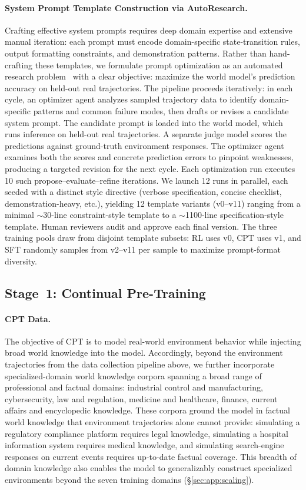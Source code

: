 \documentclass{llmxive}
\begin{document}
\paragraph{System Prompt Template Construction via AutoResearch.}
Crafting effective system prompts requires deep domain expertise and extensive manual iteration: each prompt must encode domain-specific state-transition rules, output formatting constraints, and demonstration patterns.
Rather than hand-crafting these templates, we formulate prompt optimization as an automated research problem~\citep{karpathy2026autoresearch} with a clear objective: maximize the world model's prediction accuracy on held-out real trajectories.
The pipeline proceeds iteratively: in each cycle, an optimizer agent analyzes sampled trajectory data to identify domain-specific patterns and common failure modes, then drafts or revises a candidate system prompt.
The candidate prompt is loaded into the world model, which runs inference on held-out real trajectories. A separate judge model scores the predictions against ground-truth environment responses.
The optimizer agent examines both the scores and concrete prediction errors to pinpoint weaknesses, producing a targeted revision for the next cycle.
Each optimization run executes 10 such propose--evaluate--refine iterations.
We launch 12 runs in parallel, each seeded with a distinct style directive (verbose specification, concise checklist, demonstration-heavy, etc.), yielding 12 template variants (v0--v11) ranging from a minimal $\sim$30-line constraint-style template to a $\sim$1100-line specification-style template.
Human reviewers audit and approve each final version.
The three training pools draw from disjoint template subsets: RL uses v0, CPT uses v1, and SFT randomly samples from v2--v11 per sample to maximize prompt-format diversity.


\subsection{Stage~1: Continual Pre-Training}
\label{sec:pipeline:cpt}

\paragraph{CPT Data.}
The objective of CPT is to model real-world environment behavior while injecting broad world knowledge into the model.
Accordingly, beyond the environment trajectories from the data collection pipeline above, we further incorporate specialized-domain world knowledge corpora spanning a broad range of professional and factual domains: industrial control and manufacturing, cybersecurity, law and regulation, medicine and healthcare, finance, current affairs and encyclopedic knowledge.
These corpora ground the model in factual world knowledge that environment trajectories alone cannot provide: simulating a regulatory compliance platform requires legal knowledge, simulating a hospital information system requires medical knowledge, and simulating search-engine responses on current events requires up-to-date factual coverage.
This breadth of domain knowledge also enables the model to generalizably construct specialized environments beyond the seven training domains (\S\ref{sec:app:scaling}).
\end{document}
